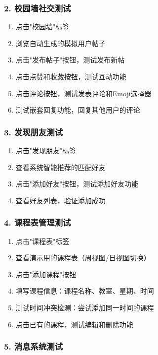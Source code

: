 \documentclass[12pt,a4paper]{article}
\begin{document}
\subsubsection{2. 校园墙社交测试}

\begin{enumerate}
    \item 点击"校园墙"标签
    \item 浏览自动生成的模拟用户帖子
    \item 点击"发布帖子"按钮，测试发布新帖
    \item 点击点赞和收藏按钮，测试互动功能
    \item 点击评论按钮，测试发表评论和Emoji选择器
    \item 测试嵌套回复功能，回复其他用户的评论
\end{enumerate}

\subsubsection{3. 发现朋友测试}

\begin{enumerate}
    \item 点击"发现朋友"标签
    \item 查看系统智能推荐的匹配好友
    \item 点击"添加好友"按钮，测试添加好友功能
    \item 查看好友列表，验证添加成功
\end{enumerate}

\subsubsection{4. 课程表管理测试}

\begin{enumerate}
    \item 点击"课程表"标签
    \item 查看演示用的课程表（周视图/日视图切换）
    \item 点击"添加课程"按钮
    \item 填写课程信息：课程名称、教室、星期、时间
    \item 测试时间冲突检测：尝试添加同一时间的课程
    \item 点击已有的课程，测试编辑和删除功能
\end{enumerate}

\subsubsection{5. 消息系统测试}
\end{document}
